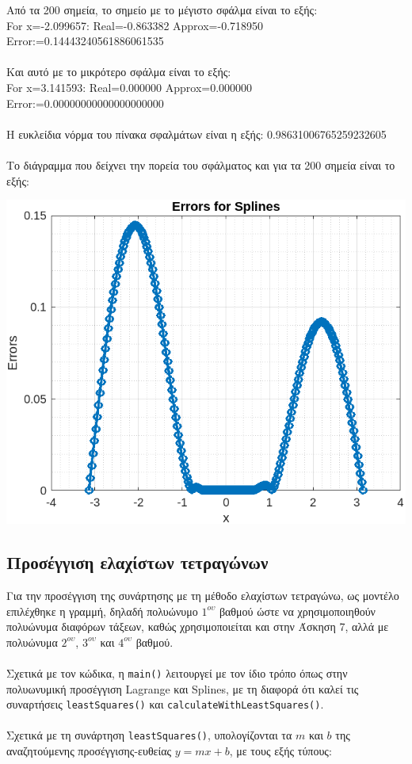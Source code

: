 \documentclass[a4paper, 14pt]{article}   %
\begin{document}
Από τα 200 σημεία, το σημείο με το μέγιστο σφάλμα είναι το εξής:\\
For x=-2.099657: Real=-0.863382 Approx=-0.718950 Error:=0.14443240561886061535\\\\
Και αυτό με το μικρότερο σφάλμα είναι το εξής:\\
For x=3.141593: Real=0.000000 Approx=0.000000 Error:=0.00000000000000000000\\\\
Η ευκλείδια νόρμα του πίνακα σφαλμάτων είναι η εξής: 0.98631006765259232605\\\\
Το διάγραμμα που δείχνει την πορεία του σφάλματος και για τα 200 σημεία είναι το εξής:

\begin{center}   %
	\includegraphics[scale=0.75]{splinesErrors.png}
\end{center}   %
	
\subsection*{Προσέγγιση ελαχίστων τετραγώνων}   %
	Για την προσέγγιση της συνάρτησης με τη μέθοδο ελαχίστων τετραγώνω, ως μοντέλο επιλέχθηκε η γραμμή, δηλαδή πολυώνυμο $1^{ου}$ βαθμού ώστε να χρησιμοποιηθούν πολυώνυμα διαφόρων τάξεων, καθώς χρησιμοποιείται και στην Άσκηση 7, αλλά με πολυώνυμα $2^{ου}$, $3^{ου}$ και $4^{ου}$ βαθμού.\\\\
Σχετικά με τον κώδικα, η \texttt{main()} λειτουργεί με τον ίδιο τρόπο όπως στην πολυωνυμική προσέγγιση Lagrange και Splines, με τη διαφορά ότι καλεί τις συναρτήσεις \texttt{leastSquares()} και \texttt{calculateWithLeastSquares()}.\\\\
Σχετικά με τη συνάρτηση \texttt{leastSquares()}, υπολογίζονται τα $m$ και $b$ της αναζητούμενης προσέγγισης-ευθείας $y = mx + b$, με τους εξής τύπους:
\end{document}
